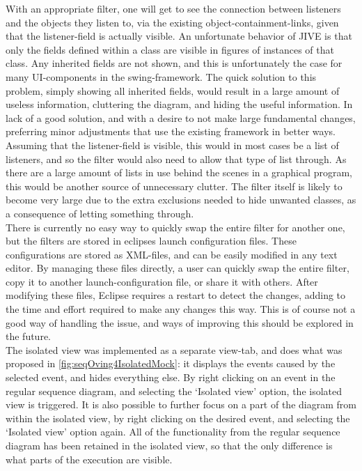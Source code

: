 With an appropriate filter, one will get to see the connection between listeners and the objects they listen to, via the existing object-containment-links, given that the listener-field is actually visible.
An unfortunate behavior of JIVE is that only the fields defined within a class are visible in figures of instances of that class.
Any inherited fields are not shown, and this is unfortunately the case for many UI-components in the swing-framework.
The quick solution to this problem, simply showing all inherited fields, would result in a large amount of useless information, cluttering the diagram, and hiding the useful information.
In lack of a good solution, and with a desire to not make large fundamental changes, preferring minor adjustments that use the existing framework in better ways.
Assuming that the listener-field is visible, this would in most cases be a list of listeners, and so the filter would also need to allow that type of list through.
As there are a large amount of lists in use behind the scenes in a graphical program, this would be another source of unnecessary clutter.
The filter itself is likely to become very large due to the extra exclusions needed to hide unwanted classes, as a consequence of letting something through.
~\\

There is currently no easy way to quickly swap the entire filter for another one, but the filters are stored in eclipses launch configuration files.
These configurations are stored as XML-files, and can be easily modified in any text editor.
By managing these files directly, a user can quickly swap the entire filter, copy it to another launch-configuration file, or share it with others.
After modifying these files, Eclipse requires a restart to detect the changes, adding to the time and effort required to make any changes this way.
This is of course not a good way of handling the issue, and ways of improving this should be explored in the future.
~\\

The isolated view was implemented as a separate view-tab, and does what was proposed in \autoref{fig:seqOving4IsolatedMock}: it displays the events caused by the selected event, and hides everything else.
By right clicking on an event in the regular sequence diagram, and selecting the `Isolated view' option, the isolated view is triggered.%
It is also possible to further focus on a part of the diagram from within the isolated view, by right clicking on the desired event, and selecting the `Isolated view' option again.
All of the functionality from the regular sequence diagram has been retained in the isolated view, so that the only difference is what parts of the execution are visible.
~\\
 

